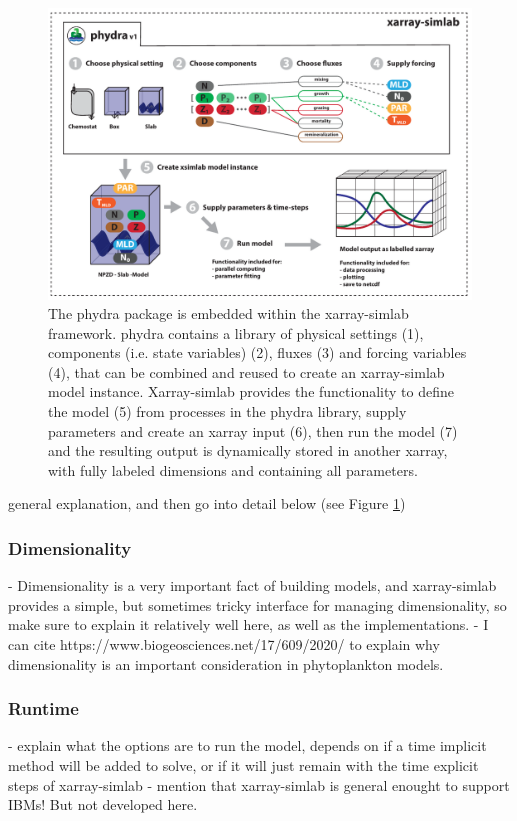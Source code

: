 \documentclass[journal abbreviation, manuscript]{copernicus}
\begin{document}
%
\begin{figure}[t]
\includegraphics[width=12cm]{Figures/firstdraft_schematics/01__schematics_phydra.pdf}
\caption{The phydra package is embedded within the xarray-simlab framework. phydra contains a library of physical settings (1), components (i.e. state variables) (2), fluxes (3) and forcing variables (4), that can be combined and reused to create an xarray-simlab model instance. Xarray-simlab provides the functionality to define the model (5) from processes in the phydra library, supply parameters and create an xarray input (6), then run the model (7) and the resulting output is dynamically stored in another xarray, with fully labeled dimensions and containing all parameters.}
\label{phydraschematics}
\end{figure}

general explanation, and then go into detail below (see Figure \ref{phydraschematics})

\subsubsection{Dimensionality}
- Dimensionality is a very important fact of building models, and xarray-simlab provides a simple, but sometimes tricky interface for managing dimensionality, so make sure to explain it relatively well here, as well as the implementations.
- I can cite https://www.biogeosciences.net/17/609/2020/ to explain why dimensionality is an important consideration in phytoplankton models.

\subsubsection{Runtime}
- explain what the options are to run the model, depends on if a time implicit method will be added to solve, or if it will just remain with the time explicit steps of xarray-simlab
- mention that xarray-simlab is general enought to support IBMs! But not developed here.
\end{document}
